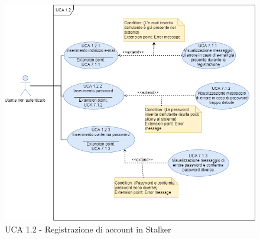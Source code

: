 \begin{figure}[h]
  \centering
    \includegraphics[scale=0.5]{sezioni/UseCase/Immagini/UCA1.2.png}
  \caption{UCA 1.2 -  Registrazione di account in Stalker}
\end{figure}

